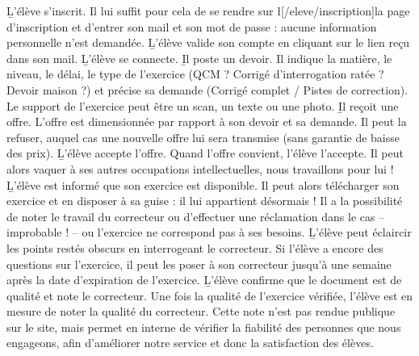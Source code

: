 ﻿\begin{enumerate}
	\li \b{L'élève s'inscrit.} Il lui suffit pour cela de se rendre sur \l[/eleve/inscription]{la page d'inscription} et d'entrer son mail et son mot de passe : aucune information personnelle n'est demandée.
   \li \b{L'élève valide son compte en cliquant sur le lien reçu dans son mail.}
   \li \b{L'élève se connecte.}
   \li \b{Il poste un devoir.} Il indique la matière, le niveau, le délai, le type de l'exercice (QCM ? Corrigé d'interrogation ratée ? Devoir maison ?) et précise sa demande (Corrigé complet / Pistes de correction). Le support de l'exercice peut être un scan, un texte ou une photo.
   \li \b{Il reçoit une offre.} L'offre est dimensionnée par rapport à son devoir et sa demande. Il peut la refuser, auquel cas une nouvelle offre lui sera transmise (sans garantie de baisse des prix).
   \li \b{L'élève accepte l'offre.} Quand l'offre convient, l'élève l'accepte. Il peut alors vaquer à ses autres occupations intellectuelles, nous travaillons pour lui !
   \li \b{L'élève est informé que son exercice est disponible.} Il peut alors télécharger son exercice et en disposer à sa guise : il lui appartient désormais ! Il a la possibilité de noter le travail du correcteur ou d'effectuer une réclamation dans le cas -- improbable ! -- ou l'exercice ne correspond pas à ses besoins.
   \li \b{L'élève peut éclaircir les points restés obscurs en interrogeant le correcteur.} Si l'élève a encore des questions sur l'exercice, il peut les poser à son correcteur jusqu'à une semaine après la date d'expiration de l'exercice.
   \li \b{L'élève confirme que le document est de qualité et note le correcteur.} Une fois la qualité de l'exercice vérifiée, l'élève est en mesure de noter la qualité du correcteur. Cette note n'est pas rendue publique sur le site, mais permet en interne de vérifier la fiabilité des personnes que nous engageons, afin d'améliorer notre service et donc la satisfaction des élèves.
\end{enumerate}